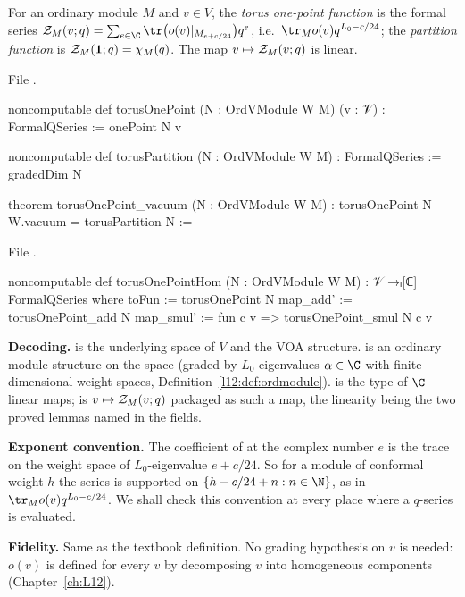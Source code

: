 \begin{definition}\label{l15:def:torusonepoint}
For an ordinary module $M$ and $v\in V$, the \emph{torus one-point function} is the formal series
$\lfifteenZ_M(v;q)=\sum_{e\in\C}\tr\bigl(o(v)|_{M_{e+c/24}}\bigr)q^{e}$, i.e.\ $\tr_M o(v)q^{L_0-c/24}$; the
\emph{partition function} is $\mathcal{Z}_M(\mathbf{1};q)=\chi_M(q)$. The map $v\mapsto\mathcal{Z}_M(v;q)$ is linear.
\end{definition}
\noindent File .
\begin{leancode}
noncomputable def torusOnePoint (N : OrdVModule W M) (v : 𝒱) : FormalQSeries := onePoint N v

noncomputable def torusPartition (N : OrdVModule W M) : FormalQSeries := gradedDim N

theorem torusOnePoint_vacuum (N : OrdVModule W M) : torusOnePoint N W.vacuum = torusPartition N :=
\end{leancode}
\noindent File .
\begin{leancode}
noncomputable def torusOnePointHom (N : OrdVModule W M) : 𝒱 →ₗ[ℂ] FormalQSeries where
  toFun := torusOnePoint N
  map_add' := torusOnePoint_add N
  map_smul' := fun c v => torusOnePoint_smul N c v
\end{leancode}

\begin{dictionary}
\textbf{Decoding.}  is the underlying space of $V$ and  the VOA structure.
 is an ordinary module structure on the space  (graded by $L_0$-eigenvalues
$\alpha\in\C$ with finite-dimensional weight spaces, Definition~\ref{l12:def:ordmodule}). 
is the type of $\C$-linear maps;  is $v\mapsto\mathcal{Z}_M(v;q)$ packaged as such a map, the
linearity being the two proved lemmas named in the fields.

\textbf{Exponent convention.} The coefficient of  at the complex number $e$ is the trace on
the weight space of $L_0$-eigenvalue $e+c/24$. So for a module of conformal weight $h$ the series is supported on
$\{h-c/24+n:n\in\N\}$, as in $\tr_M o(v)q^{L_0-c/24}$. We shall check this convention at every place where a $q$-series
is evaluated.

\textbf{Fidelity.} Same as the textbook definition. No grading hypothesis on $v$ is needed: $o(v)$ is defined for every
$v$ by decomposing $v$ into homogeneous components (Chapter~\ref{ch:L12}).
\end{dictionary}

